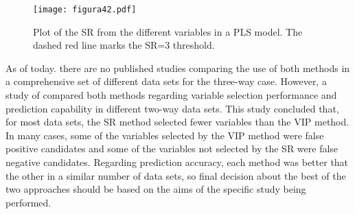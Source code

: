 \begin{figure}[hbtp]
\centering
\texttt{[image: figura42.pdf]}
\caption[Plot of the SR from the different variables in a PLS model]{Plot of the SR from the different variables in a PLS model. The dashed red line marks the SR=3 threshold.}
\label{figura42}
\end{figure}

As of today. there are no published studies comparing the use of both methods in a comprehensive set of different data sets for the three-way case. However, a study of \textcite{farres2015comparison} compared both methods regarding variable selection performance and prediction capability in different two-way data sets. This study concluded that, for most data sets, the SR method selected fewer variables than the VIP method. In many cases, some of the variables selected by the VIP method were false positive candidates and some of the variables not selected by the SR were false negative candidates. Regarding prediction accuracy, each method was better that the other in a similar number of data sets, so final decision about the best of the two approaches should be based on the aims of the specific study being performed. 